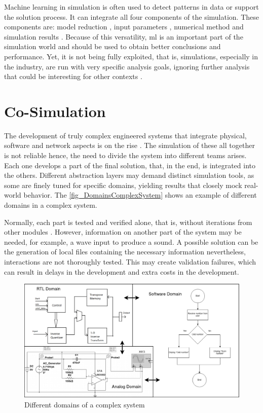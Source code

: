 Machine learning in simulation is often used to detect patterns in data or support the solution process. It can integrate all four components 
of the simulation. These components are: model reduction \cite{benner2015survey}, input parameters \cite{tsymbalov2019deeper}, numerical 
method \cite{noe2020machine} and simulation results \cite{albertsson2018machine}. Because of this versatility, \gls{ml} is an important part 
of the simulation world and should be used to obtain better conclusions and performance. Yet, it is not being fully exploited, that is, 
simulations, especially in the industry, are run with very specific analysis goals, ignoring further analysis that could be interesting for 
other contexts \cite{von2020combining}.

\section{Co-Simulation}

The development of truly complex engineered systems that integrate physical, software and network aspects is on the rise \cite{gomes2017co}. 
The simulation of these all together is not reliable hence, the need to divide the system into different teams arises. Each one develops a 
part of the final solution, that, in the end, is integrated into the others. Different abstraction layers may demand distinct simulation tools, 
as some are finely tuned for specific domains, yielding results that closely mock real-world behavior. The \autoref{fig_DomainsComplexSystem} 
shows an example of different domains in a complex system. 

Normally, each part is tested and verified alone, that is, without iterations from other modules \cite{gomes2017co}. However, information on 
another part of the system may be needed, for example, a wave input to produce a sound. A possible solution can be the generation of local 
files containing the necessary information nevertheless, interactions are not thoroughly tested. This may create validation failures, which 
can result in delays in the development and extra costs in the development.

\begin{figure}[]
	\centering
 	\includegraphics[width=0.9\linewidth]{Images/DomainsComplexSystem.png}
 	\caption{Different domains of a complex system}
	 \label{fig_DomainsComplexSystem}
\end{figure}

